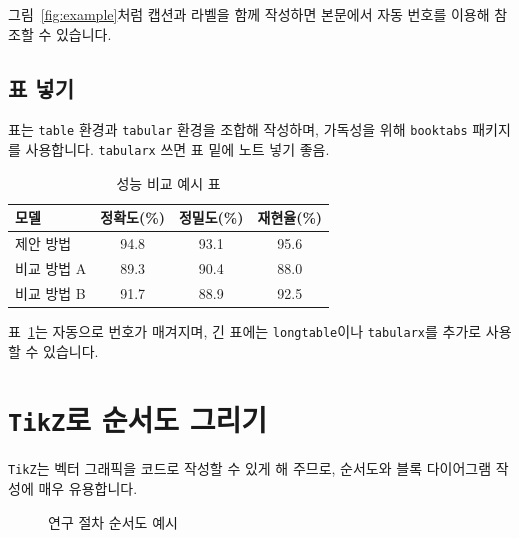 \documentclass[doctor, korean]{pnuthesis_me}
\begin{document}
그림~\ref{fig:example}처럼 캡션과 라벨을 함께 작성하면 본문에서 자동 번호를 이용해 참조할 수 있습니다.






\section{표 넣기}
표는 \texttt{table} 환경과 \texttt{tabular} 환경을 조합해 작성하며, 가독성을 위해 \texttt{booktabs} 패키지를 사용합니다.
\texttt{tabularx} 쓰면 표 밑에 노트 넣기 좋음.

\begin{table}[htbp]
    \centering
    \caption{성능 비교 예시 표}
    \label{tab:performance}
    \begin{tabular}{lccc}
        \toprule
        모델 & 정확도(\%) & 정밀도(\%) & 재현율(\%) \\
        \midrule
        제안 방법 & 94.8 & 93.1 & 95.6 \\
        비교 방법 A & 89.3 & 90.4 & 88.0 \\
        비교 방법 B & 91.7 & 88.9 & 92.5 \\
        \bottomrule
    \end{tabular}
\end{table}

표~\ref{tab:performance}는 자동으로 번호가 매겨지며, 긴 표에는 \texttt{longtable}이나 \texttt{tabularx}를 추가로 사용할 수 있습니다.





\chapter{\texttt{TikZ}로 순서도 그리기}
\texttt{TikZ}는 벡터 그래픽을 코드로 작성할 수 있게 해 주므로, 순서도와 블록 다이어그램 작성에 매우 유용합니다.

\begin{figure}[htbp]
    \centering
    \caption{연구 절차 순서도 예시}
    \label{fig:workflow}
\end{figure}
\end{document}
